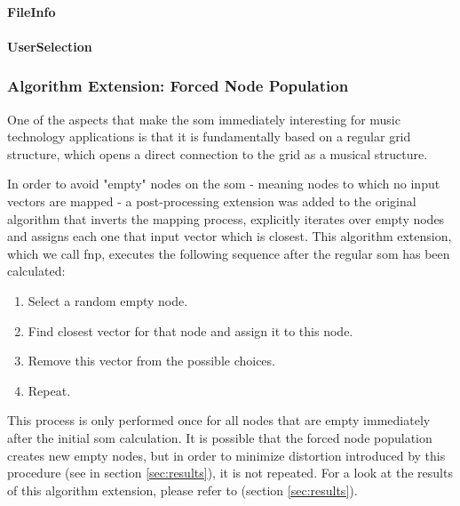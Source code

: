 \paragraph{FileInfo}
\label{para:file_info}

\paragraph{UserSelection}
\label{para:user_selection}

\subsubsection{Algorithm Extension: Forced Node Population}
\label{subsubsec:som_forced_population}
One of the aspects that make the \gls{som} immediately interesting for music
technology applications is that it is fundamentally based on a regular grid
structure, which opens a direct connection to the grid as a musical structure.

In order to avoid "empty" nodes on the \gls{som} - meaning nodes to which no
input vectors are mapped - a post-processing extension was added to the original
algorithm that inverts the mapping process, explicitly iterates over empty nodes
and assigns each one that input vector which is closest. This algorithm
extension, which we call \gls{fnp}, executes the following
sequence after the regular \gls{som} has been calculated:

\begin{enumerate}
  \item Select a random empty node.
  \item Find closest vector for that node and assign it to this node.
  \item Remove this vector from the possible choices.
  \item Repeat.
\end{enumerate}

This process is only performed once for all nodes that are empty immediately
after the initial \gls{som} calculation. It is possible that the forced node
population creates new empty nodes, but in order to minimize distortion
introduced by this procedure
(see  in section \ref{sec:results}),
it is not repeated. For a look at the results of this algorithm extension,
please refer to
 (section \ref{sec:results}).
